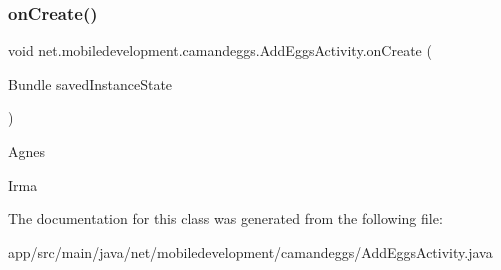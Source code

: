 \subsubsection{\texorpdfstring{on\+Create()}{onCreate()}}
{\footnotesize\ttfamily void net.\+mobiledevelopment.\+camandeggs.\+Add\+Eggs\+Activity.\+on\+Create (\begin{DoxyParamCaption}\item[{Bundle}]{saved\+Instance\+State }\end{DoxyParamCaption})\hspace{0.3cm}{\ttfamily [protected]}}

Agnes

Irma

The documentation for this class was generated from the following file\+:\begin{DoxyCompactItemize}
\item 
app/src/main/java/net/mobiledevelopment/camandeggs/Add\+Eggs\+Activity.\+java\end{DoxyCompactItemize}
